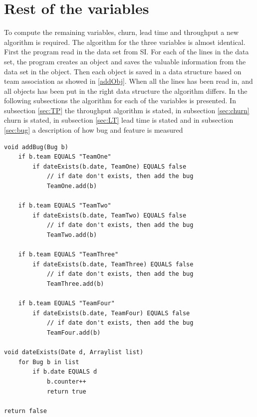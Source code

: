 \documentclass[UKenglish]{ifimaster}  %
\begin{document}
 \section{Rest of the variables}
 \label{sec:rotv}
To compute the remaining variables, churn, lead time and throughput a new algorithm is required.  The algorithm for the three variables is almost identical. First the program read in the data set from SI. For each of the lines in the data set, the program creates an object and saves the valuable information from the data set in the object. Then each object is saved in a data structure based on team association as showed in \ref{addObj}. When all the lines has been read in, and all objects has been put in the right data structure the algorithm differs. In the following subsections the algorithm for each of the variables is presented. In subsection \ref{sec:TP} the throughput algorithm is stated, in subsection \ref{sec:churn} churn is stated, in subsection \ref{sec:LT} lead time is stated and in subsection \ref{sec:bug}  a description of how bug and feature is measured 
\begin{minipage}{\textwidth}
\begin{lstlisting}[caption=Pseudocode example of how throughput objects are added, label=addObj]
void addBug(Bug b)
	if b.team EQUALS "TeamOne"
		if dateExists(b.date, TeamOne) EQUALS false
			// if date don't exists, then add the bug
			TeamOne.add(b)
			
	if b.team EQUALS "TeamTwo"
		if dateExists(b.date, TeamTwo) EQUALS false
			// if date don't exists, then add the bug
			TeamTwo.add(b)
			
	if b.team EQUALS "TeamThree"
		if dateExists(b.date, TeamThree) EQUALS false 
			// if date don't exists, then add the bug
			TeamThree.add(b)
			
	if b.team EQUALS "TeamFour"
		if dateExists(b.date, TeamFour) EQUALS false
			// if date don't exists, then add the bug
			TeamFour.add(b)
		
void dateExists(Date d, Arraylist list)
	for Bug b in list
		if b.date EQUALS d
			b.counter++
			return true
	
return false	
 \end{lstlisting}
 \end{minipage}
 
\end{document}
